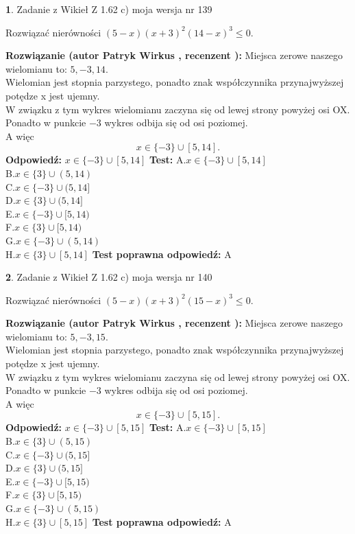 \documentclass[12pt, a4paper]{article}
\theoremstyle{definition} %
\newtheorem{zad}{}
\newcommand{\zadStart}[1]{\begin{zad}#1\newline}
\newcommand{\zadStop}{\end{zad}}
\newcommand{\rozwStart}[2]{\noindent \textbf{Rozwiązanie (autor #1 , recenzent #2): }\newline}
\newcommand{\rozwStop}{\newline}
\newcommand{\odpStart}{\noindent \textbf{Odpowiedź:}\newline}
\newcommand{\odpStop}{\newline}
\newcommand{\testStart}{\noindent \textbf{Test:}\newline}
\newcommand{\testStop}{\newline}
\newcommand{\kluczStart}{\noindent \textbf{Test poprawna odpowiedź:}\newline}
\newcommand{\kluczStop}{\newline}
\begin{document}
\zadStart{Zadanie z Wikieł Z 1.62 c) moja wersja nr 139}

Rozwiązać nierówności $(5-x)(x+3)^{2}(14-x)^{3}\le0$.
\zadStop
\rozwStart{Patryk Wirkus}{}
Miejsca zerowe naszego wielomianu to: $5, -3, 14$.\\
Wielomian jest stopnia parzystego, ponadto znak współczynnika przy\linebreak najwyższej potędze x jest ujemny.\\ W związku z tym wykres wielomianu zaczyna się od lewej strony powyżej osi OX.\\
Ponadto w punkcie $-3$ wykres odbija się od osi poziomej.\\
A więc $$x \in \{-3\} \cup [5,14].$$
\rozwStop
\odpStart
$x \in \{-3\} \cup [5,14]$
\odpStop
\testStart
A.$x \in \{-3\} \cup [5,14]$\\
B.$x \in \{3\} \cup (5,14)$\\
C.$x \in \{-3\} \cup (5,14]$\\
D.$x \in \{3\} \cup (5,14]$\\
E.$x \in \{-3\} \cup [5,14)$\\
F.$x \in \{3\} \cup [5,14)$\\
G.$x \in \{-3\} \cup (5,14)$\\
H.$x \in \{3\} \cup [5,14]$
\testStop
\kluczStart
A
\kluczStop



\zadStart{Zadanie z Wikieł Z 1.62 c) moja wersja nr 140}

Rozwiązać nierówności $(5-x)(x+3)^{2}(15-x)^{3}\le0$.
\zadStop
\rozwStart{Patryk Wirkus}{}
Miejsca zerowe naszego wielomianu to: $5, -3, 15$.\\
Wielomian jest stopnia parzystego, ponadto znak współczynnika przy\linebreak najwyższej potędze x jest ujemny.\\ W związku z tym wykres wielomianu zaczyna się od lewej strony powyżej osi OX.\\
Ponadto w punkcie $-3$ wykres odbija się od osi poziomej.\\
A więc $$x \in \{-3\} \cup [5,15].$$
\rozwStop
\odpStart
$x \in \{-3\} \cup [5,15]$
\odpStop
\testStart
A.$x \in \{-3\} \cup [5,15]$\\
B.$x \in \{3\} \cup (5,15)$\\
C.$x \in \{-3\} \cup (5,15]$\\
D.$x \in \{3\} \cup (5,15]$\\
E.$x \in \{-3\} \cup [5,15)$\\
F.$x \in \{3\} \cup [5,15)$\\
G.$x \in \{-3\} \cup (5,15)$\\
H.$x \in \{3\} \cup [5,15]$
\testStop
\kluczStart
A
\kluczStop
\end{document}

